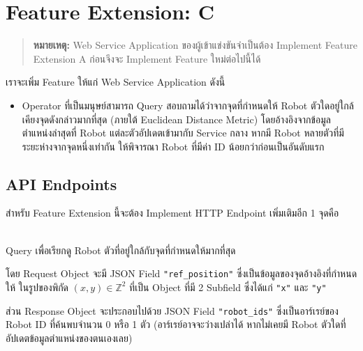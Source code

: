 
%

\section{Feature Extension: C}

\begin{quote}
  \footnotesize
  \textbf{หมายเหตุ:} Web Service Application ของผู้เข้าแข่งขันจำเป็นต้อง Implement Feature Extension A ก่อนจึงจะ Implement Feature ใหม่ต่อไปนี้ได้
\end{quote}

\noindent
เราจะเพิ่ม Feature ให้แก่ Web Service Application ดังนี้
\begin{itemize}[topsep=0pc,itemsep=0pc]
\item  
    Operator ที่เป็นมนุษย์สามารถ Query สอบถามได้ว่าจากจุดที่กำหนดให้ Robot ตัวใดอยู่ใกล้เคียงจุดดังกล่าวมากที่สุด (ภายใต้ Euclidean Distance Metric)
    โดยอ้างอิงจากข้อมูลตำแหน่งล่าสุดที่ Robot แต่ละตัวอัปเดตเข้ามากับ Service กลาง \;
    หากมี Robot หลายตัวที่มีระยะห่างจากจุดหนึ่งเท่ากัน ให้พิจารณา Robot ที่มีค่า ID น้อยกว่าก่อนเป็นอันดับแรก
\end{itemize}

\subsection{API Endpoints}

\noindent
สำหรับ Feature Extension นี้จะต้อง Implement HTTP Endpoint เพิ่มเติมอีก 1 จุดคือ

\begin{description}[parsep=0.5pc]
\item[\npt{POST}{/nearest}] ~ \\
    Query เพื่อเรียกดู Robot ตัวที่อยู่ใกล้กับจุดที่กำหนดให้มากที่สุด 
    
    โดย Request Object จะมี JSON Field \lstinline{"ref_position"} ซึ่งเป็นข้อมูลของจุดอ้างอิงที่กำหนดให้ ในรูปของพิกัด $(x, y) \in \mathbb{Z}^2$ ที่เป็น Object ที่มี 2 Subfield ซึ่งได้แก่ \lstinline{"x"} และ \lstinline{"y"}
    
    ส่วน Response Object จะประกอบไปด้วย JSON Field \lstinline{"robot_ids"} ซึ่งเป็นอาร์เรย์ของ Robot ID ที่ค้นพบจำนวน 0 หรือ 1 ตัว
    (อาร์เรย์อาจจะว่างเปล่าได้ หากไม่เคยมี Robot ตัวใดที่อัปเดตข้อมูลตำแหน่งของตนเองเลย)
\end{description}

